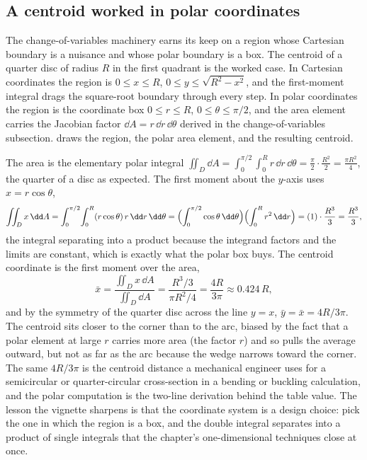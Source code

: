 \subsection{A centroid worked in polar coordinates}

The change-of-variables machinery earns its keep on a region whose
Cartesian boundary is a nuisance and whose polar boundary is a box. The
centroid of a quarter disc of radius $R$ in the first quadrant is the
worked case. In Cartesian coordinates the region is $0 \leq x \leq R$,
$0 \leq y \leq \sqrt{R^{2} - x^{2}}$, and the first-moment integral
drags the square-root boundary through every step. In polar coordinates
the region is the coordinate box $0 \leq r \leq R$, $0 \leq \theta \leq
\pi/2$, and the area element carries the Jacobian factor $\dd A =
r\,\dd r\,\dd\theta$ derived in the change-of-variables subsection.
 draws the region, the polar area
element, and the resulting centroid.

The area is the elementary polar integral $\iint_{D}\dd A =
\int_{0}^{\pi/2}\!\int_{0}^{R} r\,\dd r\,\dd\theta = \tfrac{\pi}{2}\cdot
\tfrac{R^{2}}{2} = \tfrac{\pi R^{2}}{4}$, the quarter of a disc as
expected. The first moment about the $y$-axis uses $x = r\cos\theta$,
\[
\iint_{D} x\,\dd A = \int_{0}^{\pi/2}\!\int_{0}^{R}(r\cos\theta)\,r\,
\dd r\,\dd\theta = \Bigl(\int_{0}^{\pi/2}\cos\theta\,\dd\theta\Bigr)
\Bigl(\int_{0}^{R} r^{2}\,\dd r\Bigr) = (1)\cdot\frac{R^{3}}{3} =
\frac{R^{3}}{3},
\]
the integral separating into a product because the integrand factors and
the limits are constant, which is exactly what the polar box buys. The
centroid coordinate is the first moment over the area,
\[
\bar{x} = \frac{\iint_{D} x\,\dd A}{\iint_{D}\dd A} =
\frac{R^{3}/3}{\pi R^{2}/4} = \frac{4R}{3\pi} \approx 0.424\,R,
\]
and by the symmetry of the quarter disc across the line $y = x$,
$\bar{y} = \bar{x} = 4R/3\pi$. The centroid sits closer to the corner
than to the arc, biased by the fact that a polar element at large $r$
carries more area (the factor $r$) and so pulls the average outward, but
not as far as the arc because the wedge narrows toward the corner. The
same $4R/3\pi$ is the centroid distance a mechanical engineer uses for a
semicircular or quarter-circular cross-section in a bending or
buckling calculation, and the polar computation is the two-line
derivation behind the table value. The lesson the vignette sharpens is
that the coordinate system is a design choice: pick the one in which the
region is a box, and the double integral separates into a product of
single integrals that the chapter's one-dimensional techniques close at
once.

